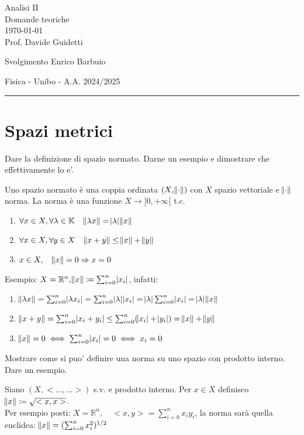 \documentclass{exam}
\newcommand{\R}[0]{\mathbb{R}}
\begin{document}
\begingroup  
    \centering
    \LARGE Analisi II\\
    \LARGE Domande teoriche\\[0.5em]
    \large \today\\[0.5em]
    \large Prof. Davide Guidetti\par
    \large Svolgimento Enrico Barbuio\par
    \large Fisica - Unibo - A.A. 2024/2025\par
\endgroup
\par\noindent\rule{\textwidth}{0.4pt}

\section*{Spazi metrici}
\begin{questions}

\question Dare la definizione di spazio normato. Darne un esempio e dimostrare che effettivamente lo e’.
\begin{solution}
    Uno spazio normato è una coppia ordinata $(X, \norm{\cdot})$ con $X$ spazio vettoriale e $\norm{\cdot}$ norma. La norma è una funzione $X \xrightarrow{} [0, + \infty[$ t.c. 
    \begin{enumerate}
        \item $\forall  x \in X, \forall \lambda \in \mathbb{K} \quad \norm{\lambda x} = \abs{\lambda} \norm{x}$
        \item $\forall x \in X, \forall y \in X \quad \norm{x+y} \leq \norm{x} + \norm{y}$
        \item $x \in X, \quad \norm{x} = 0 \Rightarrow x=0$
    \end{enumerate}
    Esempio: $X = \R^n, \norm{x} \coloneqq \sum_{i=0}^n\abs{x_i}$, infatti:
    \begin{enumerate}
        \item $\norm{\lambda x} = \sum_{i=0}^n\abs{\lambda x_i} = \sum_{i=0}^n\abs{\lambda} \abs{x_i} = \abs{\lambda} \sum_{i=0}^n\abs{x_i} = \abs{\lambda} \norm{x}$
        \item $\norm{x+y} = \sum_{i=0}^n\abs{x_i + y_i} \leq \sum_{i=0}^n(\abs{x_i} + \abs{y_i}) = \norm{x} + \norm{y}$
        \item $\norm{x} = 0 \iff \sum_{i=0}^n\abs{x_i} = 0 \iff  x_i = 0$
    \end{enumerate}
\end{solution}

\question Mostrare come si puo’ definire una norma su uno spazio con prodotto interno. Dare un esempio.
\begin{solution}
    Siano $(X, < \ldots , \ldots>)$ s.v. e prodotto interno. Per $x \in X$ definisco $\norm{x} \coloneqq \sqrt{<x,x>}$.\\
    Per esempio posti: $X = \R^n, \quad <x,y> = \sum_{i=0}^n x_i y_i$, 
    la norma sarà quella euclidea: $\norm{x} = (\sum_{i=0}^n x_i^2)^{1/2}$
\end{solution}


\end{questions}
\end{document}
